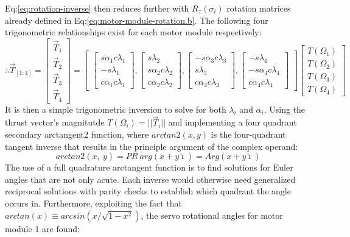 Eq:\ref{eq:rotation-inverse} then reduces further with $R_z(\sigma_i)$ rotation matrices already defined in Eq:\ref{eq:motor-module-rotation.b}. The following four trigonometric relationships exist for each motor module respectively:
\begin{equation}\label{eq:5.13}
\therefore\vec{T}_{[1:4]}=
\begin{bmatrix}
\vec{T}_1\\
\vec{T}_2\\
\vec{T}_3\\
\vec{T}_4
\end{bmatrix}
=
\begin{bmatrix}
\begin{bmatrix}
s\alpha_1 c\lambda_1\\
-s\lambda_1 \\
c\alpha_1 c\lambda_1
\end{bmatrix}
,
\begin{bmatrix}
s\lambda_2\\
s\alpha_2 c\lambda_2\\
c\alpha_2 c\lambda_2
\end{bmatrix}
,
\begin{bmatrix}
-s\alpha_3 c\lambda_3\\
s\lambda_3\\
c\alpha_3 c\lambda_3
\end{bmatrix}
,
\begin{bmatrix}
-s\lambda_4\\
-s\alpha_4 c\lambda_4\\
c\alpha_4 c\lambda_4
\end{bmatrix}
\end{bmatrix}
\begin{bmatrix}
T(\Omega_1)\\
T(\Omega_2)\\
T(\Omega_3)\\
T(\Omega_4)
\end{bmatrix}
\end{equation}
It is then a simple trigonometric inversion to solve for both $\lambda_i$ and $\alpha_i$. Using the thrust vector's magnitutde $T(\Omega_i)=||\vec{T}_i||$ and implementing a four quadrant secondary arctangent2 function, where $arctan2(x,y)$ is the four-quadrant tangent inverse that results in the principle argument of the complex operand:
\begin{equation}
arctan2(x,~y)=PR~arg(x+y\hat{\imath})=Arg(x+y\hat{\imath})
\end{equation}
The use of a full quadrature arctangent function is to find solutions for Euler angles that are not only acute. Each inverse would otherwise need generalized reciprocal solutions with parity checks to establish which quadrant the angle occurs in. Furthermore, exploiting the fact that $arctan(x)\equiv arcsin(x/\sqrt{1-x^2})$, the servo rotational angles for motor module 1 are found:
